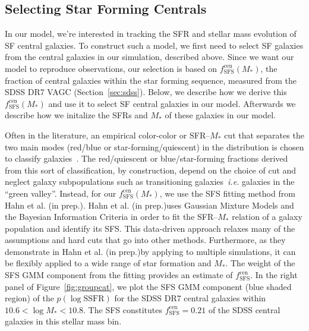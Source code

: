 \documentclass[12pt, letterpaper, preprint]{aastex}
\newcommand{\hahngmm}{Hahn et al. (in prep.)}
\begin{document}
\subsection{Selecting Star Forming Centrals}  \label{sec:sfcen}
In our model, we're interested in tracking the SFR and stellar mass 
evolution of SF central galaxies. To construct such a model, we 
first need to select SF galaxies from the central galaxies in our 
simulation, described above. Since we want our model to reproduce 
observations, our selection is based on $f^\mathrm{cen}_\mathrm{SFS}(M_*)$, 
the fraction of central galaxies within the star forming sequence, 
measured from the SDSS DR7 VAGC (Section~\ref{sec:sdss}). Below, we 
describe how we derive this $f^\mathrm{cen}_\mathrm{SFS}(M_*)$ and use 
it to select SF central galaxies in our model. Afterwards we describe how 
we initalize the SFRs and $M_*$ of these galaxies in our model.

Often in the literature, an empirical color-color or SFR--$M_*$ cut 
that separates the two main modes (red/blue or star-forming/quiescent) 
in the distribution is chosen to classify 
galaxies~\citep[\emph{e.g.}][]{baldry2006, blanton2009, drory2009, peng2010, moustakas2013, hahn2015}.
The red/quiescent or blue/star-forming fractions derived from this sort 
of classification, by construction, depend on the choice of cut and 
neglect galaxy subpopulations such as transitioning galaxies~\emph{i.e.} 
galaxies in the ``green valley''. Instead, for our 
$f^\mathrm{cen}_\mathrm{SFS}(M_*)$, we use the SFS fitting method 
from \hahngmm. \hahngmm uses Gaussian Mixture Models and the Bayesian 
Information Criteria in order to fit the SFR--$M_*$ relation of a galaxy 
population and identify its SFS. This data-driven approach relaxes 
many of the assumptions and hard cuts that go into other methods. 
Furthermore, as they demonstrate in \hahngmm by applying to multiple 
simulations, it can be flexibly applied to a wide range of star 
formation and $M_*$. The weight of the SFS GMM component from the 
fitting provides an estimate of $f^\mathrm{cen}_\mathrm{SFS}$. 
In the right panel of Figure~\ref{fig:groupcat}, we plot the SFS 
GMM component (blue shaded region) of the $p(\log \mathrm{SSFR})$ 
for the SDSS DR7 central galaxies within $10.6 < \log M_* < 10.8$. 
The SFS constitutes $f^\mathrm{cen}_\mathrm{SFS} = 0.21$ of the 
SDSS central galaxies in this stellar mass bin. 
\end{document}

